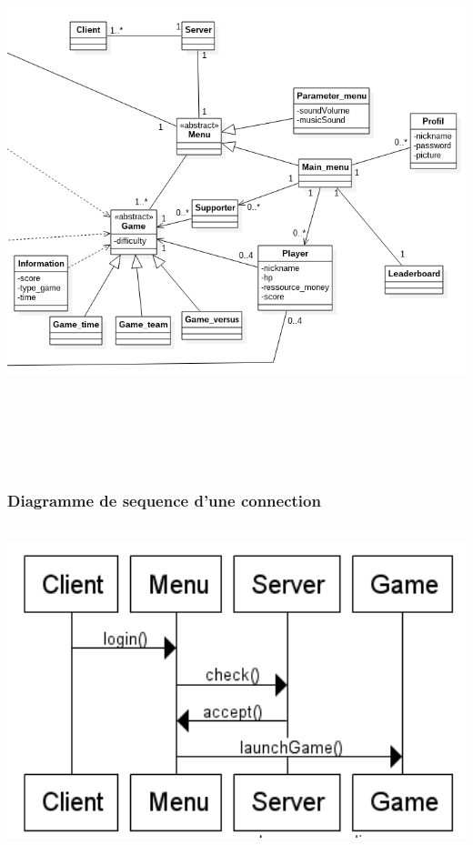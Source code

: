 \documentclass[10pt,a4paper]{article}
\begin{document}
	\includegraphics[height=16cm,width=16cm]{Class_menu.png}
\newpage
\subsubsection{Diagramme de sequence d'une connection}
  \includegraphics[height=9.5cm,width=16cm]{sequence.png} 

\newpage


\printindex
\end{document}
